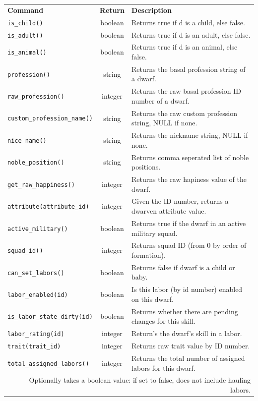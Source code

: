 \documentclass[]{article}
\begin{document}
\begin{tabular}{l c l}
\textbf{Command} & \textbf{Return} & \textbf{Description}\\
\texttt{is\_child()} & boolean & Returns true if d is a child, else false.\\
\texttt{is\_adult()} & boolean & Returns true if d is an adult, else false.\\
\texttt{is\_animal()} & boolean & Returns true if d is an animal, else false.\\
\texttt{profession()} & string & Returns the basal profession string of a dwarf.\\
\texttt{raw\_profession()} & integer & Returns the raw basal profession ID number of a dwarf.\\
\texttt{custom\_profession\_name()} & string &  Returns the raw custom profession string, NULL if none.\\
\texttt{nice\_name()} & string & Returns the nickname string, NULL if none.\\
\texttt{noble\_position()} & string & Returns comma seperated list of noble positions.\\
\texttt{get\_raw\_happiness()} & integer & Returns the raw hapiness value of the dwarf.\\
\texttt{attribute(attribute\_id)} & integer & Given the ID number, returns a dwarven attribute value.\\
\texttt{active\_military()} & boolean & Returns true if the dwarf in an active military squad.\\
\texttt{squad\_id()} & integer & Returns squad ID (from 0 by order of formation).\\
\texttt{can\_set\_labors()} & boolean & Returns false if dwarf is a child or baby.\\
\texttt{labor\_enabled(id)} & boolean & Is this labor (by id number) enabled on this dwarf.\\
\texttt{is\_labor\_state\_dirty(id)} & boolean & Returns whether there are pending changes for this skill.\\
\texttt{labor\_rating(id)} & integer & Return's the dwarf's skill in a labor.\\
\texttt{trait(trait\_id)} & integer & Returns raw trait value by ID number.\\
\texttt{total\_assigned\_labors()} & integer & Returns the total number of assigned labors for this dwarf.\\
\multicolumn{3}{r}{Optionally takes a boolean value: if set to false, does not include hauling labors.}\\

\end{tabular}
\end{document}
